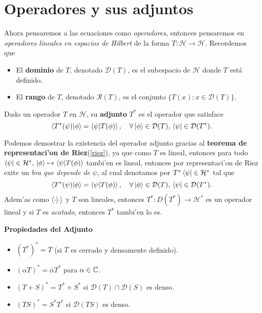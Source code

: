 \documentclass[main.tex]{subfiles}
\begin{document}
\section{Operadores y sus adjuntos}
\noindent Ahora pensaremos a las ecuaciones como \emph{operadores}, entonces pensaremos en \emph{operadores lineales en espacios de Hilbert} de la forma $T:\mathcal{H}\to\mathcal{H}$. Recordemos que
\begin{itemize}
    \item El \textbf{dominio} de $T$, denotado $\mathcal{D}(T)$, es el subespacio de $\mathcal{H}$ donde $T$ está definido.
    \item El \textbf{rango} de $T$, denotado $\mathcal{R}(T)$, es el conjunto $\{T(x) : x \in \mathcal{D}(T)\}$.
\end{itemize}
\begin{def.}
Dado un operador $T$ en $\mathcal{H}$, su \textbf{adjunto} $T^*$ es el operador que satisface
\[
\braket{T^{*}(\psi)|\phi}=\braket{\psi| T(\phi)}, \quad \forall \ket{\phi} \in \mathcal{D}(T), \, \bra{\psi} \in \mathcal{D}(T^*).
\]
\end{def.}
Podemos demostrar la existencia del operador adjunto gracias al \textbf{teorema de representaci'on de Riez}(\ref{riez}), ya que como \(T\) es lineal, entonces para todo \(\bra{\psi}\in\mathcal{H}^{*},\,\ket{\phi}\mapsto\braket{\psi|T(\phi)}\) tambi'en es lineal, entonces por representaci'on de Riez exite un \emph{bra que depende de} \(\psi\), al cual denotamos por \(T^{*}\bra{\psi}\in\mathcal{H}^{*}\) tal que
\[
  \braket{T^{*}(\psi)|\phi}=\braket{\psi| T(\phi)}, \quad \forall \ket{\phi} \in \mathcal{D}(T), \, \bra{\psi} \in \mathcal{D}(T^*).
\]
\noindent Adem'as como \(\braket{\cdot|\cdot}\) y \(T\) son lineales, entonces \(T^{*}:D(T^{*})\to\mathcal{H}^{*}\) es un operador lineal y si \(T\) es \emph{acotado}, entonces \(T^{*}\) tambi'en lo es.

\noindent\textbf{Propiedades del Adjunto}
\begin{itemize}
    \item $(T^*)^* = T$ (si $T$ es cerrado y densamente definido).
    \item $(\alpha T)^* = \overline{\alpha} T^*$ para $\alpha \in \mathbb C $.
    \item $(T + S)^* = T^* + S^*$ si $\mathcal{D}(T) \cap \mathcal{D}(S)$ es denso.
    \item $(TS)^* = S^* T^*$ si $\mathcal{D}(TS)$ es denso.
\end{itemize}
\end{document}
